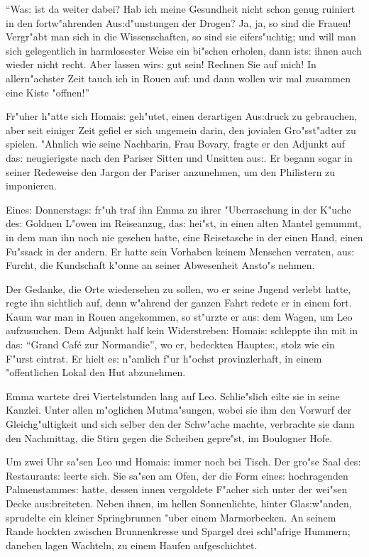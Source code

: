 \documentclass[oneside,12pt]{book}
\newcommand{\s}{s:}%
\begin{document}
"`Wa{\s} ist da weiter dabei? Hab ich meine Gesundheit nicht schon
genug ruiniert in den fortw"ahrenden Au{\s}d"unstungen der Drogen?
Ja, ja, so sind die Frauen! Vergr"abt man sich in die
Wissenschaften, so sind sie eifers"uchtig; und will man sich
gelegentlich in harmlosester Weise ein bi"schen erholen, dann
ist{\s} ihnen auch wieder nicht recht. Aber lassen wir{\s} gut
sein! Rechnen Sie auf mich! In allern"achster Zeit tauch ich in
Rouen auf: und dann wollen wir mal zusammen eine Kiste "offnen!"'

Fr"uher h"atte sich Homai{\s} geh"utet, einen derartigen
Au{\s}druck zu gebrauchen, aber seit einiger Zeit gefiel er sich
ungemein darin, den jovialen Gro"s\-st"adter zu spielen. "Ahnlich
wie seine Nachbarin, Frau Bovary, fragte er den Adjunkt auf da{\s}
neugierigste nach den Pariser Sitten und Unsitten au{\s}. Er
begann sogar in seiner Redeweise den Jargon der Pariser
anzunehmen, um den Philistern zu imponieren.

Eine{\s} Donnerstag{\s} fr"uh traf ihn Emma zu ihrer "Uberraschung
in der K"uche de{\s} Goldnen L"owen im Reiseanzug, da{\s} hei"st,
in einen alten Mantel gemummt, in dem man ihn noch nie gesehen
hatte, eine Reisetasche in der einen Hand, einen Fu"ssack in der
andern. Er hatte sein Vorhaben keinem Menschen verraten, au{\s}
Furcht, die Kundschaft k"onne an seiner Abwesenheit Ansto"s
nehmen.

Der Gedanke, die Orte wiedersehen zu sollen, wo er seine Jugend
verlebt hatte, regte ihn sichtlich auf, denn w"ahrend der ganzen
Fahrt redete er in einem fort. Kaum war man in Rouen angekommen,
so st"urzte er au{\s} dem Wagen, um Leo aufzusuchen. Dem Adjunkt
half kein Widerstreben: Homai{\s} schleppte ihn mit in da{\s}
"`Grand Caf\'e zur Normandie"', wo er, bedeckten Haupte{\s}, stolz
wie ein F"urst eintrat. Er hielt e{\s} n"amlich f"ur h"ochst
provinzlerhaft, in einem "offentlichen Lokal den Hut abzunehmen.

Emma wartete drei Viertelstunden lang auf Leo. Schlie"slich eilte
sie in seine Kanzlei. Unter allen m"oglichen Mutma"sungen, wobei
sie ihm den Vorwurf der Gleichg"ultigkeit und sich selber den der
Schw"ache machte, verbrachte sie dann den Nachmittag, die Stirn
gegen die Scheiben gepre"st, im Boulogner Hofe.

Um zwei Uhr sa"sen Leo und Homai{\s} immer noch bei Tisch. Der
gro"se Saal de{\s} Restaurant{\s} leerte sich. Sie sa"sen am Ofen,
der die Form eine{\s} hochragenden Palmenstamme{\s} hatte, dessen
innen vergoldete F"acher sich unter der wei"sen Decke
au{\s}breiteten. Neben ihnen, im hellen Sonnenlichte, hinter
Gla{\s}w"anden, sprudelte ein kleiner Springbrunnen "uber einem
Marmorbecken. An seinem Rande hockten zwischen Brunnenkresse und
Spargel drei schl"afrige Hummern; daneben lagen Wachteln, zu einem
Haufen aufgeschichtet.
\end{document}
